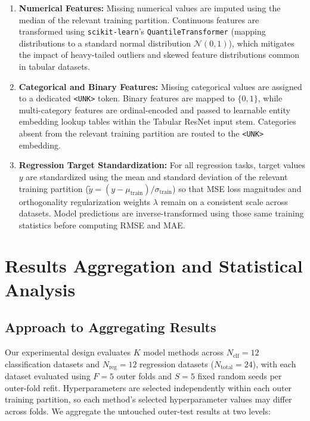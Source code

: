 \documentclass[11pt, a4paper]{article}
\begin{document}
\begin{enumerate}
    \item \textbf{Numerical Features:} Missing numerical values are imputed using the median of the relevant training partition. Continuous features are transformed using \texttt{scikit-learn}'s \texttt{QuantileTransformer} (mapping distributions to a standard normal distribution $\mathcal{N}(0, 1)$), which mitigates the impact of heavy-tailed outliers and skewed feature distributions common in tabular datasets.
    \item \textbf{Categorical and Binary Features:} Missing categorical values are assigned to a dedicated \texttt{<UNK>} token. Binary features are mapped to $\{0, 1\}$, while multi-category features are ordinal-encoded and passed to learnable entity embedding lookup tables within the Tabular ResNet input stem. Categories absent from the relevant training partition are routed to the \texttt{<UNK>} embedding.
    \item \textbf{Regression Target Standardization:} For all regression tasks, target values $y$ are standardized using the mean and standard deviation of the relevant training partition ($\tilde{y} = (y - \mu_{\text{train}}) / \sigma_{\text{train}}$) so that MSE loss magnitudes and orthogonality regularization weights $\lambda$ remain on a consistent scale across datasets. Model predictions are inverse-transformed using those same training statistics before computing RMSE and MAE.
\end{enumerate}


\section{Results Aggregation and Statistical Analysis}

\subsection{Approach to Aggregating Results}
Our experimental design evaluates $K$ model methods across $N_{\text{clf}} = 12$ classification datasets and $N_{\text{reg}} = 12$ regression datasets ($N_{\text{total}} = 24$), with each dataset evaluated using $F = 5$ outer folds and $S = 5$ fixed random seeds per outer-fold refit. Hyperparameters are selected independently within each outer training partition, so each method's selected hyperparameter values may differ across folds. We aggregate the untouched outer-test results at two levels:
\end{document}
